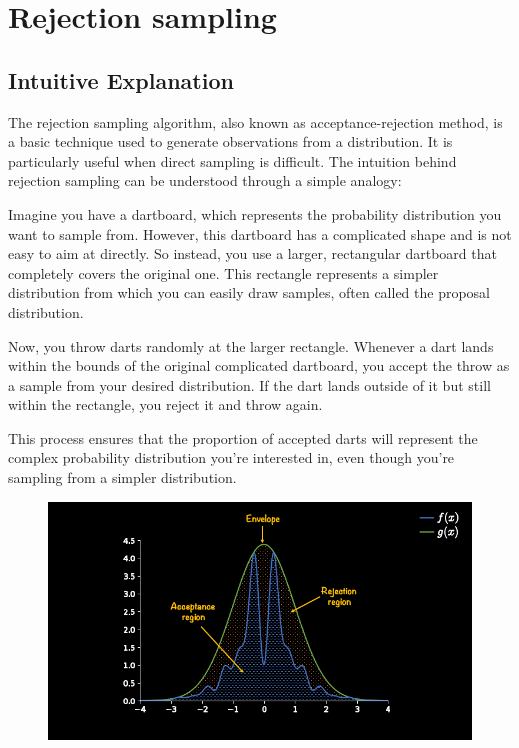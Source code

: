\documentclass{article}
\begin{document}
\section{Rejection sampling}
\subsection{Intuitive Explanation}
The rejection sampling algorithm, also known as acceptance-rejection method, is a basic technique used to generate observations from a distribution. It is particularly useful when direct sampling is difficult. The intuition behind rejection sampling can be understood through a simple analogy:

Imagine you have a dartboard, which represents the probability distribution you want to sample from. However, this dartboard has a complicated shape and is not easy to aim at directly. So instead, you use a larger, rectangular dartboard that completely covers the original one. This rectangle represents a simpler distribution from which you can easily draw samples, often called the proposal distribution.

Now, you throw darts randomly at the larger rectangle. Whenever a dart lands within the bounds of the original complicated dartboard, you accept the throw as a sample from your desired distribution. If the dart lands outside of it but still within the rectangle, you reject it and throw again.

This process ensures that the proportion of accepted darts will represent the complex probability distribution you're interested in, even though you're sampling from a simpler distribution.

\begin{figure}
    \centering
    \includegraphics[width=1\linewidth]{ox-hilary/simulation-methods/figures/1_Y8v8ASUKQxeWDHSDTJb7aA.png}
\end{figure}
\end{document}
